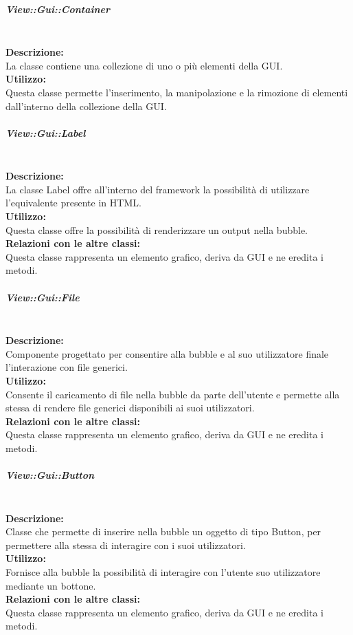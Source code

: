 \subparagraph{View\-::Gui\-::Container}\label{gui-container}\mbox{}\\
\textbf{Descrizione:}\\
La classe contiene una collezione di uno o più elementi della GUI.\\ 
\textbf{Utilizzo:}\\
Questa classe permette l'inserimento, la manipolazione e la rimozione di elementi dall'interno della collezione della GUI. 

\subparagraph{View\-::Gui\-::Label}\label{gui-label}\mbox{}\\
\textbf{Descrizione:}\\
La classe Label offre all'interno del framework la possibilità di utilizzare l'equivalente presente in HTML.\\
\textbf{Utilizzo:}\\
Questa classe offre la possibilità di renderizzare un output nella bubble.\\
\textbf{Relazioni con le altre classi:}\\
Questa classe rappresenta un elemento grafico, deriva da GUI e ne eredita i metodi.

\subparagraph{View\-::Gui\-::File}\label{gui-file}\mbox{}\\
\textbf{Descrizione:}\\
Componente progettato per consentire alla bubble e al suo utilizzatore finale l'interazione con file generici.\\
\textbf{Utilizzo:}\\
Consente il caricamento di file nella bubble da parte dell'utente e permette alla stessa di rendere file generici disponibili ai suoi utilizzatori.\\
\textbf{Relazioni con le altre classi:}\\
Questa classe rappresenta un elemento grafico, deriva da GUI e ne eredita i metodi.

\subparagraph{View\-::Gui\-::Button}\label{gui-button}\mbox{}\\
\textbf{Descrizione:}\\
Classe che permette di inserire nella bubble un oggetto di tipo Button, per permettere alla stessa di interagire con i suoi utilizzatori.\\
\textbf{Utilizzo:}\\
Fornisce alla bubble la possibilità di interagire con l'utente suo utilizzatore mediante un bottone.\\
\textbf{Relazioni con le altre classi:}\\
Questa classe rappresenta un elemento grafico, deriva da GUI e ne eredita i metodi.

